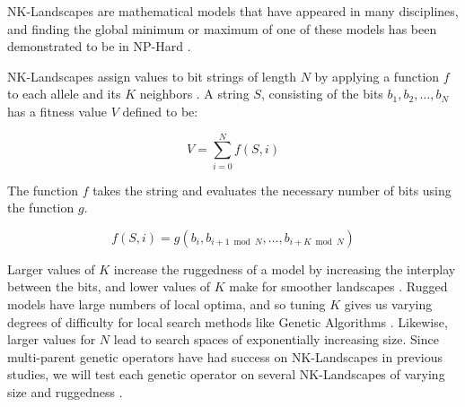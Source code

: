 NK-Landscapes are mathematical models that have appeared in many disciplines, and finding the global minimum or maximum of one of these models has been demonstrated to be in NP-Hard \cite{Weinberger96}.  

NK-Landscapes assign values to bit strings of length $N$ by applying a function $f$ to each allele and its $K$ neighbors \cite{Kauffman93}. A string $S$, consisting of the bits $b_1,b_2,\ldots,b_N$ has a fitness value $V$ defined to be:

\[ V = \sum\limits_{i = 0}^{N} f(S,i) \]

The function $f$ takes the string and evaluates the necessary number of bits using the function $g$.

\[ f(S,i) = g(b_i, b_{i+1 \bmod{N}}, \ldots, b_{i+K \bmod{N}}) \]

Larger values of $K$ increase the ruggedness of a model by increasing the interplay between the bits, and lower values of $K$ make for smoother landscapes \cite{Kauffman93}. Rugged models have large numbers of local optima, and so tuning $K$ gives us varying degrees of difficulty for local search methods like Genetic Algorithms \cite{Russell10,Skellett05}. Likewise, larger values for $N$ lead to search spaces of exponentially increasing size. Since multi-parent genetic operators have had success on NK-Landscapes in previous studies, we will test each genetic operator on several NK-Landscapes of varying size and ruggedness \cite{Eiben96,Skellett05}.